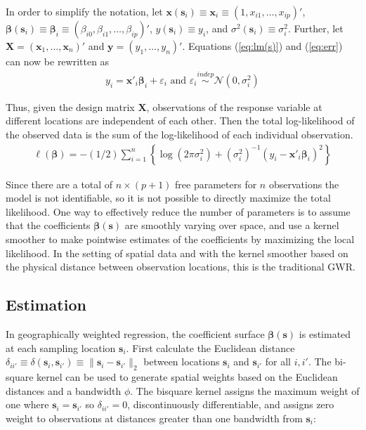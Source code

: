 \documentclass[authoryear, review, 11pt]{elsarticle}
\begin{document}
	In order to simplify the notation, let $\bm{x}(\bm{s}_i) \equiv \bm{x}_i \equiv \left( 1, x_{i1}, \dots, x_{ip} \right)'$, $\bm{\beta}(\bm{s}_i) \equiv \bm{\beta}_i \equiv \left(\beta_{i0}, \beta_{i1}, \dots, \beta_{ip} \right)'$, $y(\bm{s}_i) \equiv y_i$, and $\sigma^2(\bm{s}_i) \equiv \sigma^2_i$. Further, let $\bm{X} = \left( \bm{x}_1, \dots, \bm{x}_n \right)'$ and $\bm{y} = \left( y_1, \dots, y_n \right)'$. Equations (\ref{eq:lm(s)}) and (\ref{eq:err}) can now be rewritten as
	\begin{align}
		y_i = \bm{x}'_i \bm{\beta}_i + \varepsilon_i \text{ and } \varepsilon_i \overset{indep}{\sim} \mathcal{N} \left( 0,\sigma_i^2 \right)
	\end{align}
	
	Thus, given the design matrix $\bm{X}$, observations of the response variable at different locations are independent of each other. Then the total log-likelihood of the observed data is the sum of the log-likelihood of each individual observation.
	 \begin{align}
	 	\ell\left( \bm{\beta} \right) = - \left(1/2\right) \sum_{i=1}^n \left\{  \log \left( 2 \pi \sigma^2_i\right) +  \left(\sigma^{2}_i\right)^{-1}  \left(y_i - \bm{x}'_i\bm{\beta}_i \right)^2  \right\}
	\end{align}
	
	Since there are a total of $n \times (p+1)$ free parameters for $n$ observations the model is not identifiable, so it is not possible to directly maximize the total likelihood. One way to effectively reduce the number of parameters is to assume that the coefficients $\bm{\beta}(\bm{s})$ are smoothly varying over space, and use a kernel smoother to make pointwise estimates of the coefficients by maximizing the local likelihood. In the setting of spatial data and with the kernel smoother based on the physical distance between observation locations, this is the traditional GWR.
		
	\subsection{Estimation}		
	In geographically weighted regression, the coefficient surface $\bm{\beta}(\bm{s})$ is estimated at each sampling location $\bm{s}_i$. First calculate the Euclidean distance $\delta_{ii'} \equiv \delta\left(\bm{s}_i, \bm{s}_{i'}\right) \equiv \|\bm{s}_i  -\bm{s}_{i'}\|_2$ between locations $\bm{s}_i$ and $\bm{s}_{i'}$ for all $i, i'$. The bi-square kernel can be used to generate spatial weights based on the Euclidean distances and a bandwidth $\phi$. The bisquare kernel assigns the maximum weight of one where $\bm{s}_i = \bm{s}_{i'}$ so $\delta_{ii'}=0$, discontinuously differentiable, and assigns zero weight to observations at distances greater than one bandwidth from $\bm{s}_i$:
	
\end{document}
